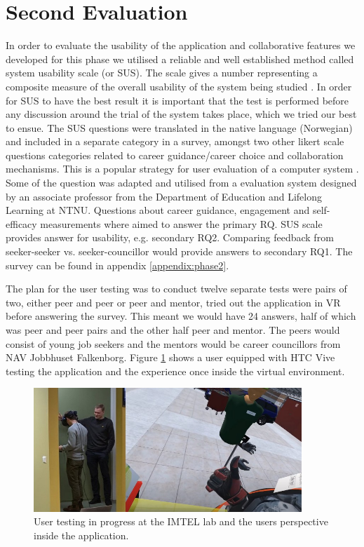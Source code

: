 \section{Second Evaluation}
\label{section:secondEvalPhase2}
In order to evaluate the usability of the application and collaborative features we developed for this phase we utilised a reliable and well established method called system usability scale (or SUS). The scale gives a number representing a composite measure of the overall usability of the system being studied \cite{brooke1996sus}. In order for SUS to have the best result it is important that the test is performed before any discussion around the trial of the system takes place, which we tried our best to ensue.
The SUS questions were translated in the native language (Norwegian) and included in a separate category in a survey, amongst two other likert scale questions categories related to career guidance/career choice and collaboration mechanisms. This is a popular strategy for user evaluation of a computer system \cite{oates2005researching}. Some of the question was adapted and utilised from a evaluation system designed by an associate professor from the Department of Education and Lifelong Learning at NTNU. Questions about career guidance, engagement and self-efficacy measurements where aimed to answer the primary RQ. SUS scale provides answer for usability, e.g. secondary RQ2. Comparing feedback from seeker-seeker vs. seeker-councillor would provide answers to secondary RQ1.  The survey can be found in appendix \ref{appendix:phase2}.

The plan for the user testing was to conduct twelve separate tests were pairs of two, either peer and peer or peer and mentor, tried out the application in VR before answering the survey. This meant we would have 24 answers, half of which was peer and peer pairs and the other half peer and mentor. The peers would consist of young job seekers and the mentors would be career councillors from NAV Jobbhuset Falkenborg. Figure \ref{fig:tastingPhase2} shows a user equipped with HTC Vive testing the application and the experience once inside the virtual environment. 


\begin{figure}[]
  \centering
   \captionsetup{width=.9\linewidth}
    \includegraphics[width=0.9\textwidth]{fig/phase_2/phase2_testing.jpg}
 \caption{User testing in progress at the IMTEL lab and the users perspective inside the application.}
\label{fig:tastingPhase2}
\end{figure}


